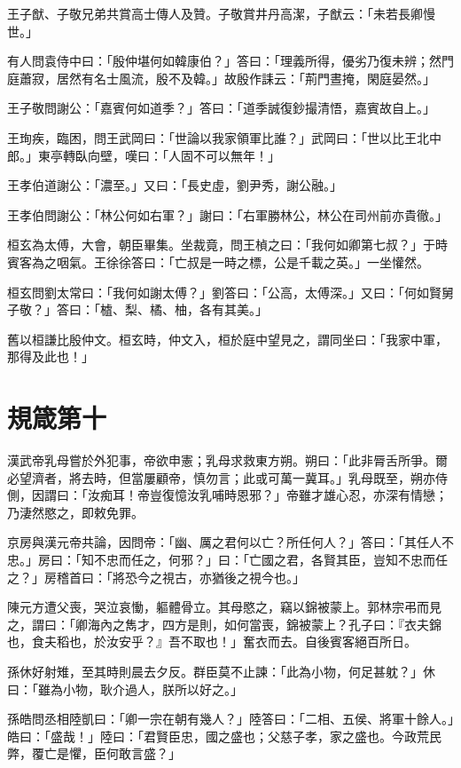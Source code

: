 王子猷、子敬兄弟共賞高士傳人及贊。子敬賞井丹高潔，子猷云：「未若長卿慢世。」

有人問袁侍中曰：「殷仲堪何如韓康伯？」答曰：「理義所得，優劣乃復未辨；然門庭蕭寂，居然有名士風流，殷不及韓。」故殷作誄云：「荊門晝掩，閑庭晏然。」

王子敬問謝公：「嘉賓何如道季？」答曰：「道季誠復鈔撮清悟，嘉賓故自上。」

王珣疾，臨困，問王武岡曰：「世論以我家領軍比誰？」武岡曰：「世以比王北中郎。」東亭轉臥向壁，嘆曰：「人固不可以無年！」

王孝伯道謝公：「濃至。」又曰：「長史虛，劉尹秀，謝公融。」

王孝伯問謝公：「林公何如右軍？」謝曰：「右軍勝林公，林公在司州前亦貴徹。」

桓玄為太傅，大會，朝臣畢集。坐裁竟，問王楨之曰：「我何如卿第七叔？」于時賓客為之咽氣。王徐徐答曰：「亡叔是一時之標，公是千載之英。」一坐懽然。

桓玄問劉太常曰：「我何如謝太傅？」劉答曰：「公高，太傅深。」又曰：「何如賢舅子敬？」答曰：「樝、梨、橘、柚，各有其美。」

舊以桓謙比殷仲文。桓玄時，仲文入，桓於庭中望見之，謂同坐曰：「我家中軍，那得及此也！」



\chapter{規箴第十}

漢武帝乳母嘗於外犯事，帝欲申憲；乳母求救東方朔。朔曰：「此非脣舌所爭。爾必望濟者，將去時，但當屢顧帝，慎勿言；此或可萬一冀耳。」乳母既至，朔亦侍側，因謂曰：「汝痴耳！帝豈復憶汝乳哺時恩邪？」帝雖才雄心忍，亦深有情戀；乃淒然愍之，即敕免罪。

京房與漢元帝共論，因問帝：「幽、厲之君何以亡？所任何人？」答曰：「其任人不忠。」房曰：「知不忠而任之，何邪？」曰：「亡國之君，各賢其臣，豈知不忠而任之？」房稽首曰：「將恐今之視古，亦猶後之視今也。」

陳元方遭父喪，哭泣哀慟，軀體骨立。其母愍之，竊以錦被蒙上。郭林宗弔而見之，謂曰：「卿海內之雋才，四方是則，如何當喪，錦被蒙上？孔子曰：『衣夫錦也，食夫稻也，於汝安乎？』吾不取也！」奮衣而去。自後賓客絕百所日。

孫休好射雉，至其時則晨去夕反。群臣莫不止諫：「此為小物，何足甚躭？」休曰：「雖為小物，耿介過人，朕所以好之。」

孫皓問丞相陸凱曰：「卿一宗在朝有幾人？」陸答曰：「二相、五侯、將軍十餘人。」皓曰：「盛哉！」陸曰：「君賢臣忠，國之盛也；父慈子孝，家之盛也。今政荒民弊，覆亡是懼，臣何敢言盛？」

